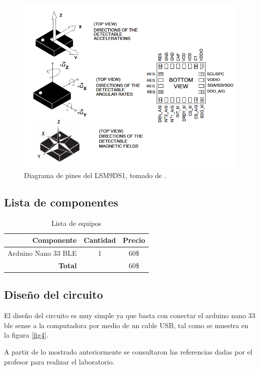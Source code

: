 \begin{figure}[H]
    \centering
    \includegraphics[width=.55\linewidth]{Imagenes/k1.png}
    \caption{Diagrama de pines del LSM9DS1, tomado de \cite{giroscopio}.}
    \label{k1}
\end{figure}


\subsection*{Lista de componentes}
\begin{table}[H]
\caption{Lista de equipos}
\label{table_2}
\begin{center}
\begin{tabular}{r|cc}
\hline
\textbf{Componente}&\textbf{Cantidad}&\textbf{Precio}\\
 \hline
Arduino Nano 33 BLE & 1 & 60\$ \\ \hline 

 \textbf{Total}& & 60\$ \\
 \hline
\end{tabular}
\end{center}
\end{table}

\subsection*{Diseño del circuito}
El diseño del circuito es muy simple ya que basta con conectar el arduino nano 33 ble sense a la computadora por medio de un cable USB, tal como se muestra en la figura \ref{fig4}.

A partir de lo mostrado anteriormente se consultaron las referencias dadas por el profesor para realizar el laboratorio.
\newpage